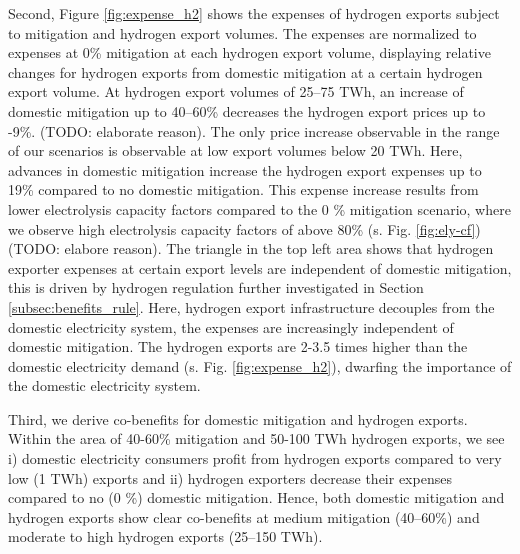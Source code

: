 Second, Figure \ref{fig:expense_h2} shows the expenses of hydrogen exports subject to mitigation and hydrogen export volumes. The expenses are normalized to expenses at 0\% mitigation at each hydrogen export volume, displaying relative changes for hydrogen exports from domestic mitigation at a certain hydrogen export volume.
At hydrogen export volumes of 25--75 TWh, an increase of domestic mitigation up to 40--60\% decreases the hydrogen export prices up to -9\%. (TODO: elaborate reason).
The only price increase observable in the range of our scenarios is observable at low export volumes below 20 TWh. Here, advances in domestic mitigation increase the hydrogen export expenses up to 19\% compared to no domestic mitigation.
This expense increase results from lower electrolysis capacity factors compared to the 0 \% mitigation scenario, where we observe high electrolysis capacity factors of above 80\% (s. Fig. \ref{fig:ely-cf}) (TODO: elabore reason).
The triangle in the top left area shows that hydrogen exporter expenses at certain export levels are independent of domestic mitigation, this is driven by hydrogen regulation further investigated in Section \ref{subsec:benefits_rule}. Here, hydrogen export infrastructure decouples from the domestic electricity system, the expenses are increasingly independent of domestic mitigation. The hydrogen exports are 2-3.5 times higher than the domestic electricity demand (s. Fig. \ref{fig:expense_h2}), dwarfing the importance of the domestic electricity system.


Third, we derive co-benefits for domestic mitigation and hydrogen exports. 
Within the area of 40-60\% mitigation and 50-100 TWh hydrogen exports, we see i) domestic electricity consumers profit from hydrogen exports compared to very low (1 TWh) exports and ii) hydrogen exporters decrease their expenses compared to no (0 \%) domestic mitigation. Hence, both domestic mitigation and hydrogen exports show clear co-benefits at medium mitigation (40--60\%) and moderate to high hydrogen exports (25--150 TWh). 



